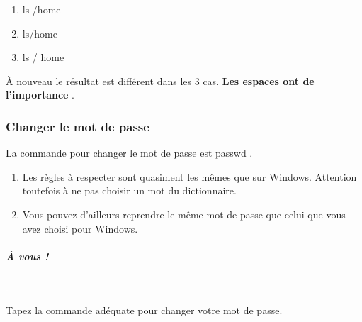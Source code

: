 \documentclass[11pt,a4paper]{article}
\begin{document}
					\begin{enumerate}
				
			\item ls /home 
			\item ls/home 
			\item ls / home 
					\end{enumerate}
				
\`A nouveau le r\'esultat est diff\'erent dans les 3 cas.  \textbf{Les espaces ont de l'importance} .



			
		\subsubsection{Changer le mot de passe} 
		\label{TD1TD1learningObject5.tex}
			
La commande pour changer le mot de passe est passwd .

					\begin{enumerate}
				
			\item Les r\`egles \`a respecter sont quasiment les m\^emes que sur Windows. Attention toutefois \`a ne pas choisir un mot du dictionnaire.
			\item Vous pouvez d'ailleurs reprendre le m\^eme mot de passe que celui que vous avez choisi pour Windows. 
					\end{enumerate}
				
			
		\subparagraph{\`A vous !} 
		
					\textcolor{white}{.} \par
				
            \par
        
Tapez la commande ad\'equate pour changer votre mot de passe.
\end{document}
